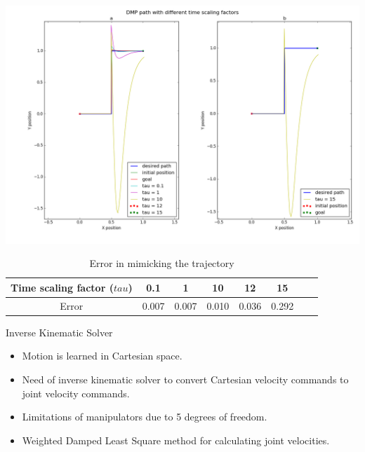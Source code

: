 \documentclass{beamer}
\begin{document}
	
	\begin{frame}
		\includegraphics[width=\textwidth]{images/tau_}
	\end{frame}
	
	\begin{frame}
		\begin{center}
			\begin{table}[H]
				\centering
				\begin{tabular}{| c | c | c | c | c | c | c | c |}	
					\hline
					Time scaling factor ($tau$) & 0.1 & 1 & 10 & 12 & 15 \\       
					\hline
					Error & 0.007 & 0.007 & 0.010 & 0.036 & 0.292   \\
					\hline
				\end{tabular}
				\caption{Error in mimicking the trajectory}
			\end{table}\label{_tau_e}
		\end{center}
	\end{frame}
	
	\begin{frame}{Inverse Kinematic Solver}
		\begin{itemize}
			\item Motion is learned in Cartesian space. 
			\item Need of inverse kinematic solver to convert Cartesian velocity commands to joint velocity commands. 
			\item Limitations of manipulators due to 5 degrees of freedom.
			\item Weighted Damped Least Square method for calculating joint velocities.
		\end{itemize}	
	\end{frame}
	
\end{document}
